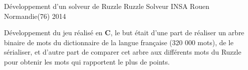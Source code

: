 \begin{cventries}
  \cventry
	{Développement d'un solveur de Ruzzle} %
	{Ruzzle Solveur} %
	{INSA Rouen Normandie(76)} %
	{2014} %
	{
		\begin{cvitems} %
			\item {Développement du jeu réalisé en \textbf{C}, le but était d'une part de réaliser un arbre binaire de mots du dictionnaire de la langue française (320 000 mots), de le sérialiser, et d'autre part de comparer cet arbre aux différents mots du Ruzzle pour obtenir les mots qui rapportent le plus de points.}
		\end{cvitems}
	}

\end{cventries}
